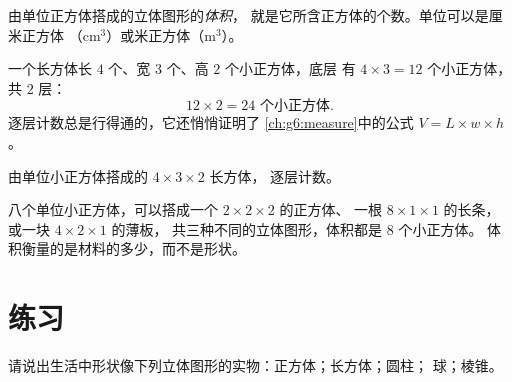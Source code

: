 \begin{definition}[用计数法求体积]\label{def:g5:solids:volume}
由单位正方体搭成的立体图形的\emph{体积}，
就是它所含正方体的个数。单位可以是厘米正方体
（cm$^3$）或米正方体（m$^3$）。
\end{definition}

\begin{example}[逐层数长方体]\label{ex:g5:solids:layers}
一个长方体长 $4$ 个、宽 $3$ 个、高 $2$ 个小正方体，底层
有 $4 \times 3 = 12$ 个小正方体，共 $2$ 层：
\[
12 \times 2 = 24 \text{ 个小正方体} .
\]
逐层计数总是行得通的，它还悄悄证明了
\cref{ch:g6:measure}中的公式 $V = L \times w \times h$。
\end{example}

\begin{omfigure}

{\small 由单位小正方体搭成的 $4 \times 3 \times 2$ 长方体，
逐层计数。}
\end{omfigure}

\begin{example}\label{ex:g5:solids:rearrange}
八个单位小正方体，可以搭成一个 $2 \times 2 \times 2$ 的正方体、
一根 $8 \times 1 \times 1$ 的长条，或一块 $4 \times 2 \times 1$ 的薄板，
共三种不同的立体图形，体积都是 $8$ 个小正方体。
体积衡量的是材料的多少，而不是形状。
\end{example}

\section{练习}

\begin{exercise}[$\star$]\label{exo:g5:solids:1}
请说出生活中形状像下列立体图形的实物：正方体；长方体；圆柱；
球；棱锥。
\end{exercise}

